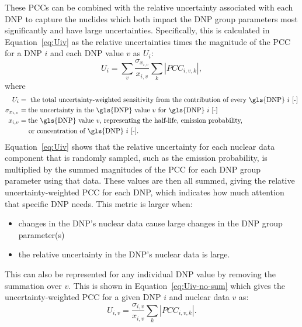 \documentclass[hidelinks]{style/nseJournal}
\begin{document}
These \glspl{PCC} can be combined with the relative uncertainty associated with each \gls{DNP} to capture the nuclides which both impact the \gls{DNP} group parameters most significantly and have large uncertainties.
Specifically, this is calculated in Equation~\eqref{eq:Uiv} as the relative uncertainties times the magnitude of the \gls{PCC} for a \gls{DNP} $i$ and each \gls{DNP} value $v$ as $U_{i}$:
\begin{equation}
    U_{i} = \sum_v \frac{\sigma_{x_{i,v}}}{x_{i,v}} \sum_k\left|PCC_{i,v,k}\right|,
    \label{eq:Uiv}
\end{equation}
where
\begin{align}
    U_{i} &= \text{ the total uncertainty-weighted sensitivity from the contribution of every \gls{DNP} $i$ [-]} \nonumber \\
    \sigma_{x_{i,v}} &= \text{the uncertainty in the \gls{DNP} value $v$ for \gls{DNP} $i$ [-]} \nonumber \\
    x_{i,v} &= \text{the \gls{DNP} value $v$, representing the half-life, emission probability,} \nonumber \\
    &\text{\;\;\;\;\;or concentration of \gls{DNP} $i$ [-].} \nonumber
\end{align}
Equation~\eqref{eq:Uiv} shows that the relative uncertainty for each nuclear data component that is randomly sampled, such as the emission probability, is multiplied by the summed magnitudes of the \gls{PCC} for each \gls{DNP} group parameter using that data.
These values are then all summed, giving the relative uncertainty-weighted \gls{PCC} for each \gls{DNP}, which indicates how much attention that specific \gls{DNP} needs.
This metric is larger when:
\begin{itemize}
    \item changes in the \gls{DNP}'s nuclear data cause large changes in the \gls{DNP} group parameter(s)
    \item the relative uncertainty in the \gls{DNP}'s nuclear data is large.
\end{itemize}

This can also be represented for any individual \gls{DNP} value by removing the summation over $v$.
This is shown in Equation~\eqref{eq:Uiv-no-sum} which gives the uncertainty-weighted \gls{PCC} for a given \gls{DNP} $i$ and nuclear data $v$ as:
\begin{equation}
    U_{i,v} = \frac{\sigma_{i,v}}{x_{i,v}} \sum_k\left|PCC_{i,v,k}\right|.
    \label{eq:Uiv-no-sum}
\end{equation}
\end{document}
